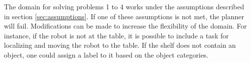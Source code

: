 \documentclass[paper=a4, fontsize=11pt]{scrartcl}
\begin{document}
\vspace{5mm}

The domain for solving problems 1 to 4 works under the assumptions described in section \ref{sec:assumptions}. If one of these assumptions is not met, the planner will fail. Modifications can be made to increase the flexibility of the domain. For instance, if the robot is not at the table, it is possible to include a task for localizing and moving the robot to the table. If the shelf does not contain an object, one could assign a label to it based on the object categories.

	{}
	
\end{document}
